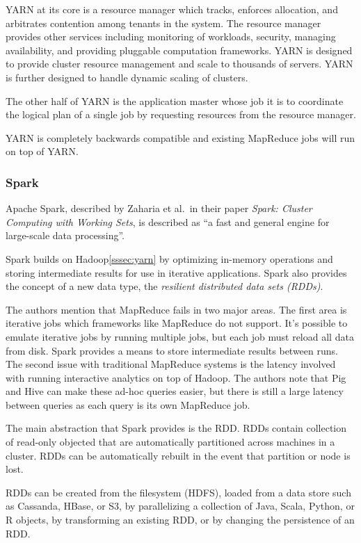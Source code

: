 \documentclass[]{article}
\begin{document}
YARN at its core is a resource manager which tracks, enforces allocation, and arbitrates contention among tenants in the system. The resource manager provides other services including monitoring of workloads, security, managing availability, and providing pluggable computation frameworks. YARN is designed to provide cluster resource management and scale to thousands of servers. YARN is further designed to handle dynamic scaling of clusters.

The other half of YARN is the application master whose job it is to coordinate the logical plan of a single job by requesting resources from the resource manager.

YARN is completely backwards compatible and existing MapReduce jobs will run on top of YARN.

\subsubsection{Spark}\label{sssec:spark}
Apache Spark, described by Zaharia et al.\ in their paper \textit{Spark: Cluster Computing with Working Sets}\cite{zaharia_spark:_2010}, is described as ``a fast and general engine for large-scale data processing''.

Spark builds on Hadoop\ref{sssec:yarn} by optimizing in-memory operations and storing intermediate results for use in iterative applications. Spark also provides the concept of a new data type, the \textit{resilient distributed data sets (RDDs)}.

The authors mention that MapReduce fails in two major areas. The first area is iterative jobs which frameworks like MapReduce do not support. It's possible to emulate iterative jobs by running multiple jobs, but each job must reload all data from disk. Spark provides a means to store intermediate results between runs. The second issue with traditional MapReduce systems is the latency involved with running interactive analytics on top of Hadoop. The authors note that Pig and Hive can make these ad-hoc queries easier, but there is still a large latency between queries as each query is its own MapReduce job.

The main abstraction that Spark provides is the RDD. RDDs contain collection of read-only objected that are automatically partitioned across machines in a cluster. RDDs can be automatically rebuilt in the event that partition or node is lost. 

RDDs can be created from the filesystem (HDFS), loaded from a data store such as Cassanda, HBase, or S3, by parallelizing a collection of Java, Scala, Python, or R objects, by transforming an existing RDD, or by changing the persistence of an RDD. 
\end{document}
